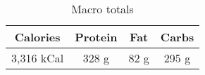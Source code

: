 \begin{multicols}{2}
\begin{enumerate}
\begin{table}[H]
    \centering
    \caption{Macro totals}
    \label{tab:table1}
    \begin{tabular}{c|c|c|c} %
      \textbf{Calories} & \textbf{Protein} & \textbf{Fat} & \textbf{Carbs}\\
      \hline
      3,316 kCal & 328 g & 82 g & 295 g\\
    \end{tabular}
\end{table}

\end{enumerate}
\end{multicols}



